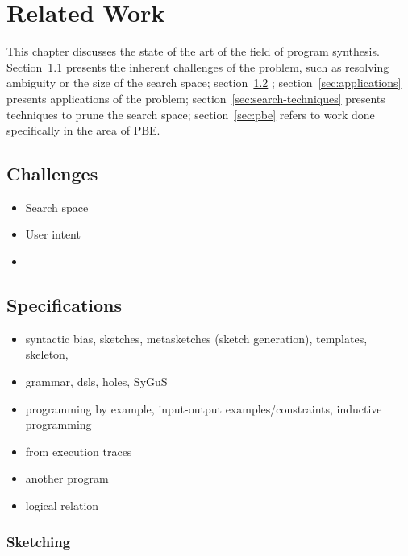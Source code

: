 \chapter{Related Work}
\label{chapter:relatedWork}


This chapter discusses the state of the art of the field of program synthesis.
Section~\ref{sec:challenges} presents the inherent challenges of the problem,
such as resolving ambiguity or the size of the search space;
section~\ref{sec:specifications} ;
section~\ref{sec:applications}
presents applications of the problem; section~\ref{sec:search-techniques}
presents techniques to prune the search space; section~\ref{sec:pbe} refers to
work done specifically in the area of \ac{PBE}.

\section{Challenges}
\label{sec:challenges}

\begin{itemize}
\item Search space
\item User intent
  \item 
\end{itemize}

\section{Specifications}
\label{sec:specifications}

\begin{itemize}
\item syntactic bias, sketches, metasketches (sketch generation), templates, skeleton,
\item   grammar, dsls, holes, SyGuS
\item programming by example, input-output examples/constraints, inductive programming
\item from execution traces
\item another program
\item logical relation
\end{itemize}

\subsection{Sketching}

